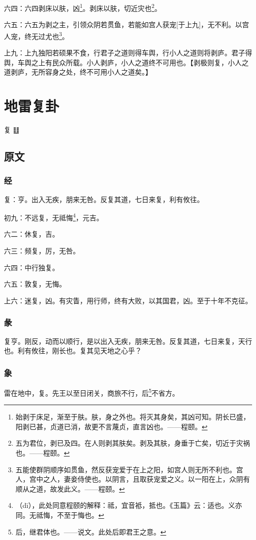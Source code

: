 \documentclass[12pt,oneside]{book}
\begin{document}
六四：六四剥床以肤，凶\footnote{始剥于床足，渐至于肤。肤，身之外也。将灭其身矣，其凶可知。阴长已盛，阳剥已甚，贞道已消，故更不言蔑贞，直言凶也。——程颐。}。剥床以肤，切近灾也\footnote{五为君位，剥已及四。在人则剥其肤矣。剥及其肤，身垂于亡矣，切近于灾祸也。——程颐。}。

六五：六五为剥之主，引领众阴若贯鱼，若能如宫人获宠[于上九]，无不利。以宫人宠，终无过尤也\footnote{五能使群阴顺序如贯鱼，然反获宠爱于在上之阳，如宫人则无所不利也。宫人，宫中之人，妻妾侍使也。以阴言，且取获宠爱之义。以一阳在上，众阴有顺从之道，故发此义。——程颐。}。

上九：上九独阳若硕果不食，行君子之道则得车舆，行小人之道则将剥庐。君子得舆，车舆之上有民众所载。小人剥庐，小人之道终不可用也。【剥极则复，小人之道剥庐，无所容身之处，终不可用小人之道矣。】


\chapter{地雷复卦}
复 {\Large ䷗}

\section{原文}
\subsection{经}
复：亨。出入无疾，朋来无咎。反复其道，七日来复，利有攸往。

初九：不远复，无祗悔\footnote{（dī），此处同意程颐的解释：祗，宜音袛，抵也。《玉篇》云：适也。义亦同。无祗悔，不至于悔也。 }，元吉。

六二：休复，吉。

六三：频复，厉，无咎。

六四：中行独复。

六五：敦复，无悔。

上六：迷复，凶。有灾眚，用行师，终有大败，以其国君，凶。至于十年不克征。

\subsection{彖}
复亨。刚反，动而以顺行，是以出入无疾，朋来无咎。反复其道，七日来复，天行也。利有攸往，刚长也。复其见天地之心乎？

\subsection{象}
雷在地中，复。先王以至日闭关，商旅不行，后\footnote{后，继君体也。——说文。此处后即君王之意。}不省方。
\end{document}
